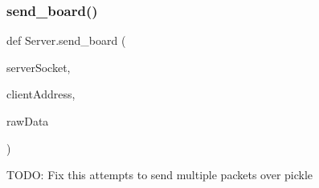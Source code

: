 \subsubsection{\texorpdfstring{send\+\_\+board()}{send\_board()}}
{\footnotesize\ttfamily def Server.\+send\+\_\+board (\begin{DoxyParamCaption}\item[{}]{server\+Socket,  }\item[{}]{client\+Address,  }\item[{}]{raw\+Data }\end{DoxyParamCaption})}

\begin{DoxyVerb}TODO: Fix this
attempts to send multiple packets over pickle
\end{DoxyVerb}
 